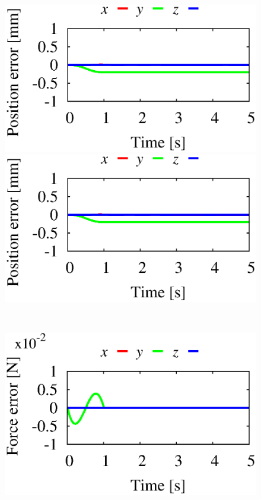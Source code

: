 %
\begin{figure}[t]
  \centering
  \begin{minipage}[h]{0.40\linewidth}
    \centering
    \includegraphics[width=1.0\linewidth]{fig/chapter6/results/spatial/RNS/RNS_U02_pos_err.eps}
  \end{minipage}
  \begin{minipage}[h]{0.40\linewidth}
    \centering
        \includegraphics[width=1.0\linewidth]{fig/chapter6/results/spatial/OSF/OSF_U02_pos_err.eps}
  \end{minipage}\\
  \vspace{-3mm}
  \begin{minipage}[h]{0.40\linewidth}
    \centering
    \includegraphics[width=1.0\linewidth]{fig/chapter6/results/spatial/RNS/RNS_U06_force_error.eps}

\end{minipage}
\end{figure}
